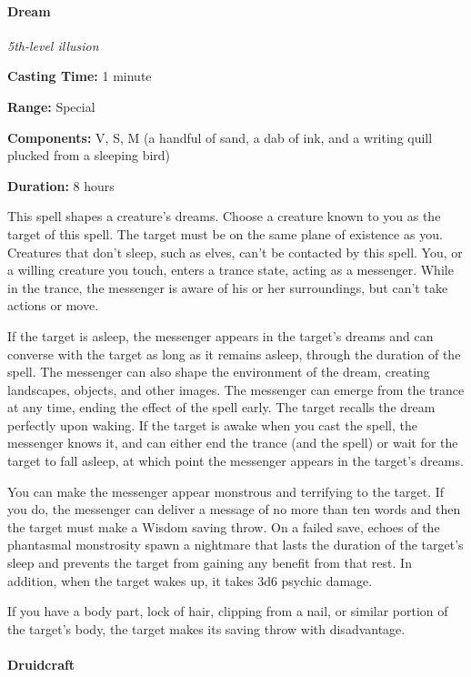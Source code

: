 \documentclass[
]{article}
\begin{document}
\hypertarget{dream}{%
\paragraph{Dream}\label{dream}}

\emph{5th-level illusion}

\textbf{Casting Time:} 1 minute

\textbf{Range:} Special

\textbf{Components:} V, S, M (a handful of sand, a dab of ink, and a
writing quill plucked from a sleeping bird)

\textbf{Duration:} 8 hours

This spell shapes a creature's dreams. Choose a creature known to you as
the target of this spell. The target must be on the same plane of
existence as you. Creatures that don't sleep, such as elves, can't be
contacted by this spell. You, or a willing creature you touch, enters a
trance state, acting as a messenger. While in the trance, the messenger
is aware of his or her surroundings, but can't take actions or move.

If the target is asleep, the messenger appears in the target's dreams
and can converse with the target as long as it remains asleep, through
the duration of the spell. The messenger can also shape the environment
of the dream, creating landscapes, objects, and other images. The
messenger can emerge from the trance at any time, ending the effect of
the spell early. The target recalls the dream perfectly upon waking. If
the target is awake when you cast the spell, the messenger knows it, and
can either end the trance (and the spell) or wait for the target to fall
asleep, at which point the messenger appears in the target's dreams.

You can make the messenger appear monstrous and terrifying to the
target. If you do, the messenger can deliver a message of no more than
ten words and then the target must make a Wisdom saving throw. On a
failed save, echoes of the phantasmal monstrosity spawn a nightmare that
lasts the duration of the target's sleep and prevents the target from
gaining any benefit from that rest. In addition, when the target wakes
up, it takes 3d6 psychic damage.

If you have a body part, lock of hair, clipping from a nail, or similar
portion of the target's body, the target makes its saving throw with
disadvantage.

\hypertarget{druidcraft}{%
\paragraph{Druidcraft}\label{druidcraft}}
\end{document}
